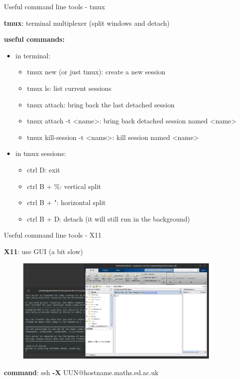 \documentclass[10pt]{beamer}
\begin{document}
\begin{frame}[fragile]{Useful command line tools - tmux}

\textbf{tmux}: terminal multiplexer (split windows and detach)

\textbf{useful commands: }

\begin{itemize}
    \item in terminal: 
    {\begin{itemize}
        \item tmux new (or just tmux): create a new session
        \item tmux ls: list current sessions
        \item tmux attach: bring back the last detached session
        \item tmux attach -t <name>: bring back detached session named <name>
        \item tmux kill-session -t <name>: kill session named <name>
    \end{itemize}}
    \item in tmux sessions: 
    {\begin{itemize}
        \item ctrl D: exit
        \item ctrl B + \%: vertical split
        \item ctrl B + ": horizontal split
        \item ctrl B + D: detach (it will still run in the background)
    \end{itemize}}
\end{itemize}

\end{frame}

\begin{frame}[fragile]{Useful command line tools - X11}

\textbf{X11\footnotemark}: use GUI (a bit slow)

\begin{figure}[!ht]
\centering
\includegraphics[width = 0.9\textwidth]{images/X11.png}
\end{figure}

\textbf{command}: ssh \textbf{-X} UUN@hostname.maths.ed.ac.uk

\hfill


\end{frame}
\end{document}
